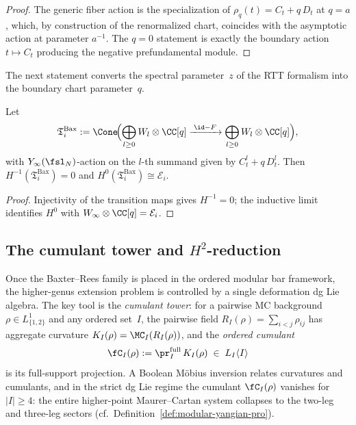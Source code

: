 \begin{proof}
The generic fiber action is the specialization of
$\rho_q(t) = C_t + q\,D_t$ at $q = a$, which, by construction
of the renormalized chart, coincides with the asymptotic action
at parameter $a^{-1}$. The $q = 0$ statement is exactly the boundary
action $t \mapsto C_t$ producing the negative prefundamental module.
\end{proof}

The next statement converts the spectral parameter~$z$ of the RTT
formalism into the boundary chart parameter~$q$.

\begin{proposition}
\label{prop:baxter-rees-derived-realization}
Let
\begin{equation}
 \mathfrak{T}_i^{\mathrm{Bax}}
 :=
 \Cone\!\Bigl(
 \bigoplus_{l \ge 0} W_l \otimes \CC[q]
 \xrightarrow{\;\id - F\;}
 \bigoplus_{l \ge 0} W_l \otimes \CC[q]
 \Bigr),
\end{equation}
with $Y_\infty(\fsl_N)$-action on the $l$-th summand given by
$C_t^l + q\,D_t^l$. Then
$H^{-1}(\mathfrak{T}_i^{\mathrm{Bax}}) = 0$ and
$H^0(\mathfrak{T}_i^{\mathrm{Bax}}) \cong \mathcal{E}_i$.
\end{proposition}

\begin{proof}
Injectivity of the transition maps gives $H^{-1} = 0$; the
inductive limit identifies $H^0$ with
$W_\infty \otimes \CC[q] = \mathcal{E}_i$.
\end{proof}

\subsection{The cumulant tower and $H^2$-reduction}

Once the Baxter--Rees family is placed in the ordered modular bar
framework, the higher-genus extension problem is controlled by a
single deformation dg Lie algebra. The key tool is the
\emph{cumulant tower}: for a pairwise MC background
$\rho \in L_{\{1,2\}}^1$ and any ordered set~$I$, the pairwise field
$R_I(\rho) = \sum_{i<j} \rho_{ij}$ has aggregate curvature
$K_I(\rho) = \MC_I(R_I(\rho))$, and the \emph{ordered cumulant}
\begin{equation}\label{eq:ordered-cumulant}
 \fC_I(\rho) := \pr_I^{\mathrm{full}}\,K_I(\rho)
 \;\in\; L_I\langle I\rangle
\end{equation}
is its full-support projection. A Boolean M\"obius inversion relates
curvatures and cumulants, and in the strict dg Lie regime the
cumulant $\fC_I(\rho)$ vanishes for $|I| \ge 4$: the entire
higher-point Maurer--Cartan system collapses to the two-leg and
three-leg sectors
(cf.\ Definition~\ref{def:modular-yangian-pro}).

